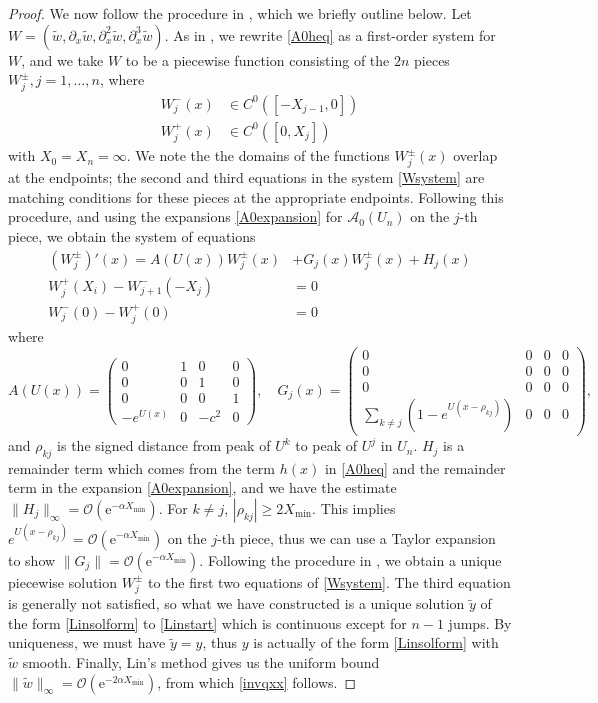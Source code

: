 \documentclass[review,onefignum,onetabnum]{siamart171218}
\newcommand{\rme}{\mathrm{e}}
\newcommand{\calA}{\mathcal{A}}
\begin{document}
\begin{proof}
We now follow the procedure in \cite{sandstede:som98}, which we briefly outline below. Let $W = (\tilde{w}, \partial_x\tilde{w},\partial_x^2 \tilde{w},\partial_x^3 \tilde{w})$. As in \cite{sandstede:som98}, we rewrite \cref{A0heq} as a first-order system for $W$, and we take $W$ to be a piecewise function consisting of the $2n$ pieces $W_j^\pm, j = 1, \dots, n$, where
\begin{align*}
W_j^-(x) &\in C^0([-X_{j-1}, 0]) \\
W_j^+(x) &\in C^0([0, X_j])
\end{align*}
with $X_0 = X_n = \infty$.
We note the the domains of the functions $W_j^\pm(x)$ overlap at the endpoints; the second and third equations in the system \cref{Wsystem} are matching conditions for these pieces at the appropriate endpoints.
Following this procedure, and using the expansions \cref{A0expansion} for $\calA_0(U_n)$ on the $j$-th piece, we obtain the system of equations
\begin{equation}\label{Wsystem}
\begin{aligned}
(W_j^\pm)'(x) = A(U(x)) W_j^\pm(x) &+ G_j(x) W_j^\pm(x)+ H_j(x) \\
W_j^+(X_i) - W_{j+1}^-(-X_j) &= 0  \\
W_j^-(0) - W_j^+(0) &= 0
\end{aligned}
\end{equation}
where
\[
A(U(x)) = \begin{pmatrix}
0 & 1 & 0 & 0 \\
0 & 0 & 1 & 0 \\
0 & 0 & 0 & 1 \\
-e^{U(x)} & 0 & -c^2 & 0
\end{pmatrix}, \quad
G_j(x) = \begin{pmatrix}
0 & 0 & 0 & 0 \\
0 & 0 & 0 & 0 \\
0 & 0 & 0 & 0 \\
\sum_{k \neq j} (1 - e^{U(x - \rho_{kj})}) & 0 & 0 & 0
\end{pmatrix},
\]
and $\rho_{kj}$ is the signed distance from peak of $U^k$ to peak of $U^j$ in $U_n$.
$H_j$ is a remainder term which comes from the term $h(x)$ in \cref{A0heq} and the remainder term in the expansion \cref{A0expansion}, and we have the estimate $\|H_j \|_\infty = \mathcal{O}(\rme^{-\alpha X_{\mathrm{min}}})$.
For $k \neq j$, $|\rho_{kj}| \geq 2 X_{\mathrm{min}}$. This implies $e^{U(x - \rho_{kj})} = \mathcal{O}(\rme^{-\alpha X_{\mathrm{min}}})$ on the $j$-th piece, thus we can use a Taylor expansion to show $\|G_j\| = \mathcal{O}(\rme^{-\alpha X_{\mathrm{min}}})$. Following the procedure in \cite{sandstede:som98}, we obtain a unique piecewise solution $W_j^\pm$ to the first two equations of \cref{Wsystem}. The third equation is generally not satisfied, so what we have constructed is a unique solution $\tilde{y}$ of the form \cref{Linsolform} to \cref{Linstart} which is continuous except for $n - 1$ jumps. By uniqueness, we must have $\tilde{y} = y$, thus $y$ is actually of the form \cref{Linsolform} with $\tilde{w}$ smooth. Finally, Lin's method gives us the uniform bound
$\|\tilde{w}\|_\infty = \mathcal{O}(\rme^{-2 \alpha X_{\mathrm{min}}})$, from which \cref{invqxx} follows.
\end{proof}
\end{document}
